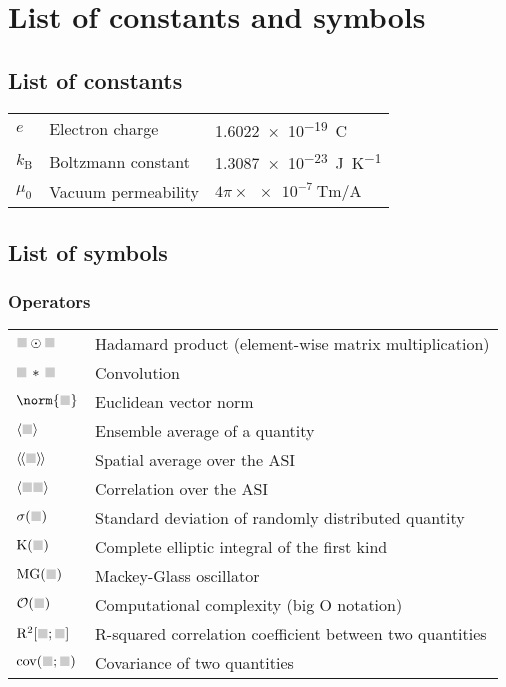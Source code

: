 \chapter{List of constants and symbols}
\newlength\whiteline
\setlength\whiteline{14pt}

\section*{List of constants}
\begin{longtable}[l]{p{60pt} p{140pt} p{200pt}}
	$e$ & Electron charge & \SI{1.6022e-19}{\coulomb} \\
	$k_\mathrm{B}$ & Boltzmann constant & \SI{1.3087e-23}{\joule\per\kelvin} \\
	$\mu_0$ & Vacuum permeability & $4 \pi \times \SI{e-7}{\tesla\metre\per\ampere}$\vspace{\whiteline}\\
\end{longtable}

\section*{List of symbols}
\subsection*{Operators}
\begin{longtable}[l]{p{60pt} p{350pt}}
	$\greybox \odot \greybox$ & Hadamard product (element-wise matrix multiplication) \\
	$\greybox \hspace{0.15em} * \hspace{0.15em} \greybox$ & Convolution \\
	$\norm{ \greybox }$ & Euclidean vector norm \\
	$\langle \greybox \rangle$ & Ensemble average of a quantity \\
	$\llangle \greybox \rrangle$ & Spatial average over the ASI \\
	$\langle \greybox \greybox \rangle$ & Correlation over the ASI \\
	$\sigma( \greybox )$ & Standard deviation of randomly distributed quantity \\
	$\mathrm{K}(\greybox)$ & Complete elliptic integral of the first kind \\
	$\mathrm{MG}(\greybox)$ & Mackey-Glass oscillator \\
	$\mathcal{O}(\greybox)$ & Computational complexity (big O notation) \\
	$\mathrm{R}^2[\greybox;\greybox]$ & R-squared correlation coefficient between two quantities \\
	$\mathrm{cov}(\greybox;\greybox)$ & Covariance of two quantities\vspace{\whiteline}\\
\end{longtable}

